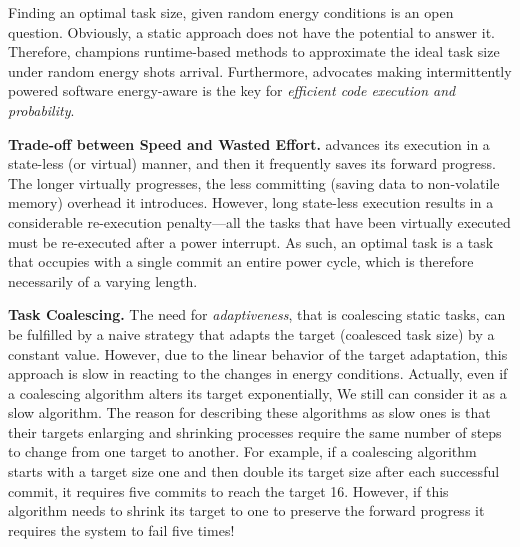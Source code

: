 Finding an optimal task size, given random energy conditions is an open question. Obviously, a static approach does not have the potential to answer it. Therefore, \sys champions runtime-based methods to approximate the ideal task size under random energy shots arrival. Furthermore, \sys advocates making intermittently powered software energy-aware is the key for \emph{efficient code execution and probability}. 

\textbf{Trade-off between Speed and Wasted Effort.} \sys advances its execution in a state-less (or virtual) manner, and then it frequently saves its forward progress. The longer \sys virtually progresses, the less committing (saving data to non-volatile memory) overhead it introduces. However, long state-less execution results in a considerable re-execution penalty---all the tasks that have been virtually executed must be re-executed after a power interrupt. As such, an optimal task is a task that occupies with a single commit an entire power cycle, which is therefore necessarily of a varying length.  


\textbf{Task Coalescing.} 
The need for \emph{adaptiveness}, that is coalescing static tasks, can be fulfilled by a naive strategy that adapts the target (coalesced task size) by a constant value. However, due to the linear behavior of the target adaptation, this approach is slow in reacting to the changes in energy conditions. Actually, even if a coalescing algorithm alters its target exponentially, We still can consider it as a slow algorithm. The reason for describing these algorithms as slow ones is that their targets enlarging and shrinking processes require the same number of steps to change from one target to another. For example, if a coalescing algorithm starts with a target size one and then double its target size after each successful commit, it requires five commits to reach the target 16. However, if this algorithm needs to shrink its target to one to preserve the forward progress it requires the system to fail five times!

